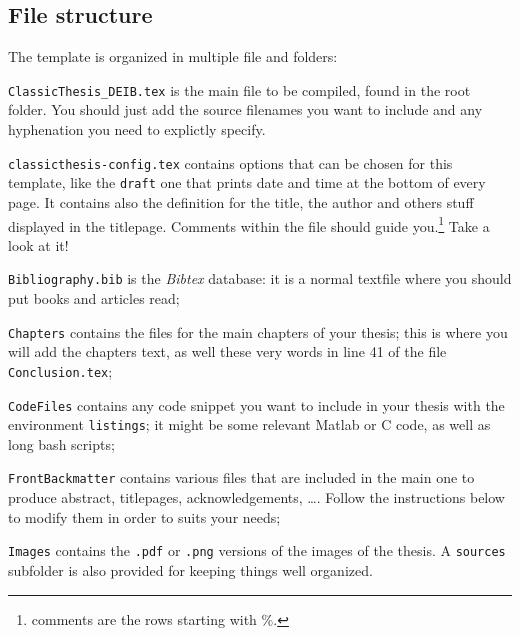 \subsection{File structure}
The template is organized in multiple file and folders:
\begin{aenumerate}

	\item \verb!ClassicThesis_DEIB.tex! is the main file to be compiled, found in the root folder.
You should just add the source filenames you want to include and any hyphenation you need to explictly specify. 

	\item \verb!classicthesis-config.tex! contains options that can be chosen for this template, like the \verb!draft! one that prints date and time at the bottom of every page.
It contains also the definition for the title, the author and others stuff displayed in the titlepage.
Comments within the file should guide you.\footnote{comments are the rows starting with $\%$.} Take a look at it!

	\item \verb!Bibliography.bib! is the \emph{Bibtex} database: it is a normal textfile where you should put books and articles read;

	\item \verb!Chapters! contains the files for the main chapters of your thesis; this is where you will add the chapters text, as well these very words in line 41 of the file \verb!Conclusion.tex!;

	\item \verb!CodeFiles! contains any code snippet you want to include in your thesis with the environment \verb!listings!; it might be some relevant Matlab or C code, as well as long bash scripts;

	\item \verb!FrontBackmatter! contains various files that are included in the main one to produce abstract, titlepages, acknowledgements, \ldots. 
Follow the instructions below to modify them in order to suits your needs;

	\item \verb!Images! contains the \verb!.pdf! or \verb!.png! versions of the images of the thesis.
A \verb!sources! subfolder is also provided for keeping things well organized.

\end{aenumerate}

